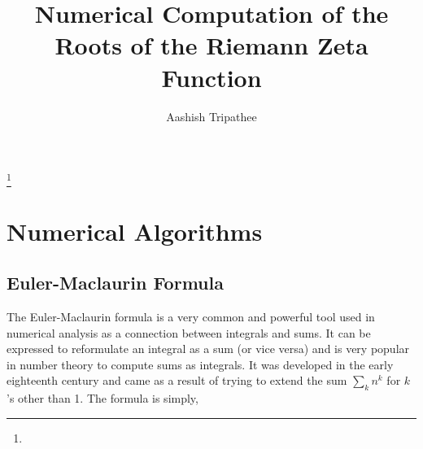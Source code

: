 \documentclass{amsproc}
\theoremstyle{definition}
\theoremstyle{remark}
\numberwithin{equation}{section}
\begin{document}
\title{Numerical Computation of the Roots of the Riemann Zeta Function}


\author{Aashish Tripathee}
\address{}
\curraddr{}
\thanks{}




\date{}

\begin{abstract}
\end{abstract}



\maketitle





\section{Numerical Algorithms}
\subsection{Euler-Maclaurin Formula}
The Euler-Maclaurin formula is a very common and powerful tool used in numerical analysis as a connection between integrals and sums. It can be expressed to reformulate an integral as a sum (or vice versa) and is very popular in number theory to compute sums as integrals. It was developed in the early eighteenth century and came as a result of trying to extend the sum $\sum_{k} n^k$ for $k$'s other than 1. The formula is simply,
\end{document}
